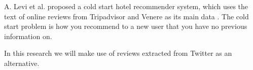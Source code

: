 A. Levi et al. proposed a cold start hotel recommender system, which uses the text of online reviews from Tripadvisor and Venere as its main data \cite{levi2012}. The cold start problem is how you recommend to a new user that you have no previous information on. 

In this research we will make use of reviews extracted from Twitter as an alternative.